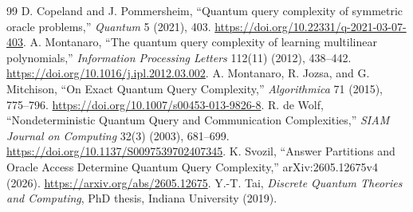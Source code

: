 \documentclass[11pt]{article}
\begin{document}
\begin{thebibliography}{99}
 D. Copeland and J. Pommersheim, ``Quantum query complexity of symmetric oracle problems,'' \emph{Quantum} 5 (2021), 403. \url{https://doi.org/10.22331/q-2021-03-07-403}.
 A. Montanaro, ``The quantum query complexity of learning multilinear polynomials,'' \emph{Information Processing Letters} 112(11) (2012), 438--442. \url{https://doi.org/10.1016/j.ipl.2012.03.002}.
 A. Montanaro, R. Jozsa, and G. Mitchison, ``On Exact Quantum Query Complexity,'' \emph{Algorithmica} 71 (2015), 775--796. \url{https://doi.org/10.1007/s00453-013-9826-8}.
 R. de Wolf, ``Nondeterministic Quantum Query and Communication Complexities,'' \emph{SIAM Journal on Computing} 32(3) (2003), 681--699. \url{https://doi.org/10.1137/S0097539702407345}.
 K. Svozil, ``Answer Partitions and Oracle Access Determine Quantum Query Complexity,'' arXiv:2605.12675v4 (2026). \url{https://arxiv.org/abs/2605.12675}.
 Y.-T. Tai, \emph{Discrete Quantum Theories and Computing}, PhD thesis, Indiana University (2019).
\end{thebibliography}
\end{document}
